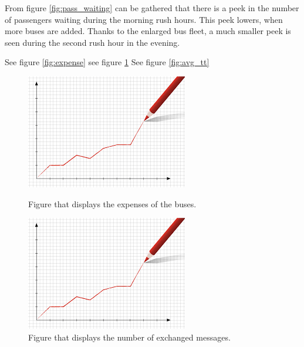 \documentclass{article}
\begin{document}
From figure \ref{fig:pass_waiting} can be gathered that there is a peek in the number of passengers waiting during the morning rush hours. This peek lowers, when more buses are added. Thanks to the enlarged bus fleet, a much smaller peek is seen during the second rush hour in the evening.

See figure \ref{fig:expense}
see figure \ref{fig:messages}
See figure \ref{fig:avg_tt}

\begin{figure}
\centering
\begin{minipage}{.5\textwidth}
  \includegraphics[width=.4\textwidth]{expenses.jpg}
  \caption{\label{fig:expense}Figure that displays the expenses of the buses.}
\end{minipage}%
\begin{minipage}{.5\textwidth}
  \includegraphics[width=.4\textwidth]{nr_messages.jpg}
  \caption{\label{fig:messages}Figure that displays the number of exchanged messages.}
\end{minipage}
\end{figure}
\end{document}
